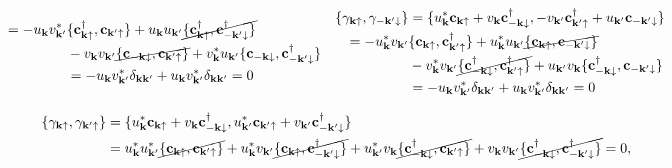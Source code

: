 \begin{equation*}
\begin{array}{cc}
\begin{split}
        = -u_{{\bf k}} v_{{\bf k}'}^* & \{{\bf c}_{{\bf k} \uparrow}^\dagger, {\bf c}_{{\bf k}' \uparrow}\} + u_{{\bf k}} u_{{\bf k}'} \cancel{\{{\bf c}_{{\bf k} \uparrow}^\dagger, {\bf c}_{-{\bf k}' \downarrow}^\dagger\}} \\
        &- v_{{\bf k}} v_{{\bf k}'} \cancel{\{{\bf c}_{-{\bf k} \downarrow}, {\bf c}_{{\bf k}' \uparrow}\}} + v_{{\bf k}}^* u_{{\bf k}'} \{{\bf c}_{-{\bf k} \downarrow}, {\bf c}_{-{\bf k}' \downarrow}^\dagger\} \\
        &= -u_{{\bf k}} v_{{\bf k}'}^* \delta_{{\bf k}{\bf k}'} +  u_{{\bf k}} v_{{\bf k}'}^* \delta_{{\bf k}{\bf k}'}= 0 
        \end{split} & \begin{split}
        \{{\gamma}_{{\bf k}\uparrow}, {\gamma}_{-{\bf k}'\downarrow}\} &= \{u_{{\bf k}}^* {\bf c}_{{\bf k}\uparrow} + v_{{\bf k}} {\bf c}_{-{{\bf k}}\downarrow}^\dagger, -v_{{\bf k}'} {\bf c}_{{\bf k}'\uparrow}^\dagger + u_{{\bf k}'} {\bf c}_{-{\bf k}'\downarrow}\} \\
        = -u_{{\bf k}}^* v_{{\bf k}'} &\{{\bf c}_{{\bf k} \uparrow}, {\bf c}_{{\bf k}'\uparrow}^\dagger\} + u_{{\bf k}}^* u_{{\bf k}'} \cancel{\{{\bf c}_{{\bf k} \uparrow}, {\bf c}_{-{\bf k}' \downarrow}\}}\\
        &- v_{{\bf k}}^* v_{{\bf k}'} \cancel{\{{\bf c}_{-{\bf k}\downarrow}^\dagger, {\bf c}_{{\bf k}'\uparrow}^\dagger\}} + u_{{\bf k}'} v_{{\bf k}} \{{\bf c}_{-{\bf k}\downarrow}^\dagger, {\bf c}_{-{\bf k}' \downarrow}\} \\
        &= -u_{{\bf k}} v_{{\bf k}'}^* \delta_{{\bf k}{\bf k}'} +  u_{{\bf k}} v_{{\bf k}'}^* \delta_{{\bf k}{\bf k}'}= 0 
        \end{split}
    \end{array}
\end{equation*}

\begin{equation*}
    \begin{split}
        \{{\gamma}_{{\bf k}\uparrow}, {\gamma}_{{\bf k}'\uparrow}\} &= \{u_{{\bf k}}^* {\bf c}_{{\bf k}\uparrow} + v_{{\bf k}} {\bf c}_{-{{\bf k}}\downarrow}^\dagger, u_{{\bf k}'}^* {\bf c}_{{\bf k}'\uparrow} + v_{{\bf k}'} {\bf c}_{-{{\bf k}'}\downarrow}^\dagger\} \\
        &= u_{{\bf k}}^*u_{{\bf k}'}^* \cancel{\{{\bf c}_{{\bf k} \uparrow}, {\bf c}_{{\bf k}' \uparrow} \}} + u_{{\bf k}}^* v_{{\bf k}'} \cancel{\{{\bf c}_{{\bf k} \uparrow}, {\bf c}_{-{\bf k}' \downarrow}^\dagger\}} + u_{{\bf k}'}^* v_{{\bf k}} \cancel{\{{\bf c}_{-{\bf k} \downarrow}^\dagger,{\bf c}_{{\bf k}' \uparrow}\}} + {v}_{{\bf k}} {v}_{{\bf k}'} \cancel{\{{\bf c}_{-{\bf k} \downarrow}^\dagger, {\bf c}_{-{\bf k}' \downarrow}^\dagger\}} = 0,
                \end{split}
\end{equation*}

